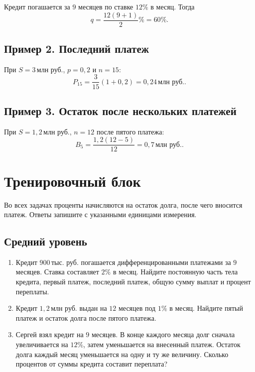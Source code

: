 \documentclass[a4paper,12pt]{article}
\newcommand{\mln}{\,\text{млн руб.}}
\newcommand{\thousand}{\,\text{тыс. руб.}}
\begin{document}
Кредит погашается за $9$ месяцев по ставке $12\%$ в месяц. Тогда
\[
q=
\frac{12(9+1)}{2}\%
=
60\%.
\]

\subsection*{Пример 2. Последний платеж}

При $S=3\mln$, $p=0{,}2$ и $n=15$:
\[
P_{15}
=
\frac{3}{15}(1+0{,}2)
=
0{,}24\mln.
\]

\subsection*{Пример 3. Остаток после нескольких платежей}

При $S=1{,}2\mln$, $n=12$ после пятого платежа:
\[
B_5
=
\frac{1{,}2(12-5)}{12}
=
0{,}7\mln.
\]

\clearpage

\section*{Тренировочный блок}

Во всех задачах проценты начисляются на остаток долга, после чего
вносится платеж. Ответы запишите с указанными единицами измерения.

\subsection*{Средний уровень}

\begin{enumerate}[
  leftmargin=1.8em,
  label=\textbf{\arabic*.},
  itemsep=0.9em
]
  \item Кредит $900\thousand$ погашается дифференцированными платежами
        за $9$ месяцев. Ставка составляет $2\%$ в месяц. Найдите
        постоянную часть тела кредита, первый платеж, последний платеж,
        общую сумму выплат и процент переплаты.

  \item Кредит $1{,}2\mln$ выдан на $12$ месяцев под $1\%$ в месяц.
        Найдите пятый платеж и остаток долга после пятого платежа.

  \item Сергей взял кредит на $9$ месяцев. В конце каждого месяца долг
        сначала увеличивается на $12\%$, затем уменьшается на внесенный
        платеж. Остаток долга каждый месяц уменьшается на одну и ту же
        величину. Сколько процентов от суммы кредита составит
        переплата?
\end{enumerate}
\end{document}
